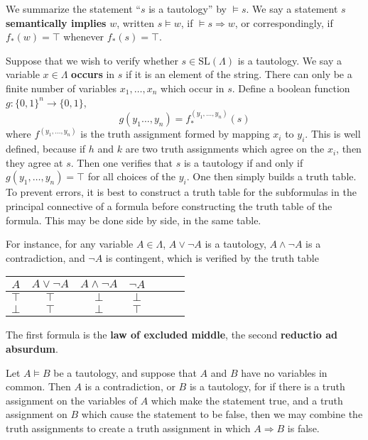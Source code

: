 We summarize the statement ``$s$ is a tautology'' by $\vDash s$. We say a statement $s$ {\bf semantically implies} $w$, written $s \vDash w$, if $\vDash s \Rightarrow w$, or correspondingly, if $f_*(w) = \top$ whenever $f_*(s) = \top$.

Suppose that we wish to verify whether $s \in \text{SL}(\Lambda)$ is a tautology. We say a variable $x \in \Lambda$ {\bf occurs} in $s$ if it is an element of the string. There can only be a finite number of variables $x_1, \dots, x_n$ which occur in $s$. Define a boolean function $g: \{ 0, 1 \}^n \to \{ 0, 1 \}$,
%
\[ g(y_1 \dots, y_n) = f^{(y_1, \dots, y_n)}_*(s) \]
%
where $f^{(y_1, \dots, y_n)}$ is the truth assignment formed by mapping $x_i$ to $y_i$. This is well defined, because if $h$ and $k$ are two truth assignments which agree on the $x_i$, then they agree at $s$. Then one verifies that $s$ is a tautology if and only if $g(y_1, \dots, y_n) = \top$ for all choices of the $y_i$. One then simply builds a truth table. To prevent errors, it is best to construct a truth table for the subformulas in the principal connective of a formula before constructing the truth table of the formula. This may be done side by side, in the same table.

\begin{example}
    For instance, for any variable $A \in \Lambda$, $A \vee \neg A$ is a tautology, $A \wedge \neg A$ is a contradiction, and $\neg A$ is contingent, which is verified by the truth table
    \begin{center}
    \begin{tabular}{| c | c | c | c | c | c | c |}
        \hline $A$ & $A \vee \neg A$ & $A \wedge \neg A$ & $\neg A$ \\
        \hline $\top$ & $\top$ & $\bot$ & $\bot$ \\
               $\bot$ & $\top$ & $\bot$ & $\top$ \\
        \hline
    \end{tabular}
    \end{center}
    The first formula is the {\bf law of excluded middle}, the second {\bf reductio ad absurdum}.
\end{example}

\begin{example}
    Let $A \vDash B$ be a tautology, and suppose that $A$ and $B$ have no variables in common. Then $A$ is a contradiction, or $B$ is a tautology, for if there is a truth assignment on the variables of $A$ which make the statement true, and a truth assignment on $B$ which cause the statement to be false, then we may combine the truth assignments to create a truth assignment in which $A \Rightarrow B$ is false.
\end{example}

